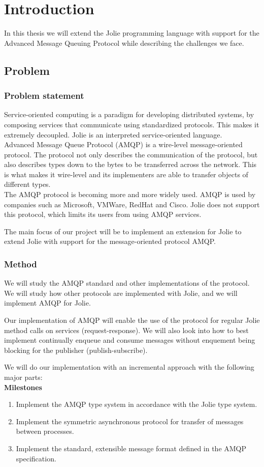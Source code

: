 \section{Introduction}
In this thesis we will extend the Jolie programming language with support for the Advanced Message Queuing Protocol while describing the challenges we face.
\subsection{Problem}
\subsubsection{Problem statement}
Service-oriented computing is a paradigm for developing distributed systems, by composing services that communicate using standardized protocols. This makes it extremely decoupled. Jolie is an interpreted service-oriented language.\\
Advanced Message Queue Protocol (AMQP) is a wire-level message-oriented protocol. The protocol not only describes the communication of the protocol, but also describes types down to the bytes to be transferred across the network. This is what makes it wire-level and its implementers are able to transfer objects of different types.\\
The AMQP protocol is becoming more and more widely used. AMQP is used by companies such as Microsoft, VMWare, RedHat and Cisco. Jolie does not support this protocol, which limits its users from using AMQP services.

The main focus of our project will be to implement an extension for Jolie to extend Jolie with support for the message-oriented protocol AMQP.
\subsubsection{Method}
We will study the AMQP standard and other implementations of the protocol. We will study how other protocols are implemented with Jolie, and we will implement AMQP for Jolie.

Our implementation of AMQP will enable the use of the protocol for regular Jolie method calls on services (request-response). We will also look into how to best implement continually enqueue and consume messages without enquement being blocking for the publisher (publish-subscribe).

We will do our implementation with an incremental approach with the following major parts:
\\\textbf{Milestones}
\begin{enumerate}
\item Implement the AMQP type system in accordance with the Jolie type system.
\item Implement the symmetric asynchronous protocol for transfer of messages between processes.
\item Implement the standard, extensible message format defined in the AMQP specification.
\end{enumerate}

